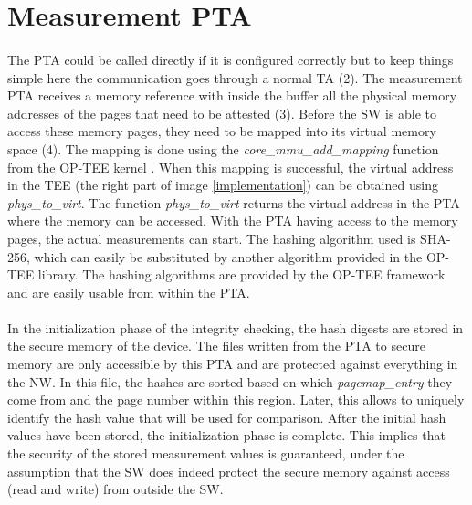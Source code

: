 \section{Measurement PTA}

\paragraph*{}
The PTA could be called directly if it is configured correctly but to keep things simple here the communication goes through a normal TA (2). The measurement PTA receives a memory reference with inside the buffer all the physical memory addresses of the pages that need to be attested (3). Before the SW is able to access these memory pages, they need to be mapped into its virtual memory space (4). The mapping is done using the \textit{core\_mmu\_add\_mapping} function from the OP-TEE kernel \cite{OPTEEgit}. When this mapping is successful, the virtual address in the TEE (the right part of image \ref{implementation}) can be obtained using \textit{phys\_to\_virt}. The function \textit{phys\_to\_virt} returns the virtual address in the PTA where the memory can be accessed. With the PTA having access to the memory pages, the actual measurements can start. The hashing algorithm used is SHA-256, which can easily be substituted by another algorithm provided in the OP-TEE library. The hashing algorithms are provided by the OP-TEE framework and are easily usable from within the PTA.

\paragraph*{}
In the initialization phase of the integrity checking, the hash digests are stored in the secure memory of the device. The files written from the PTA to secure memory are only accessible by this PTA and are protected against everything in the NW. In this file, the hashes are sorted based on which \textit{pagemap\_entry} they come from and the page number within this region. Later, this allows to uniquely identify the hash value that will be used for comparison. After the initial hash values have been stored, the initialization phase is complete. This implies that the security of the stored measurement values is guaranteed, under the assumption that the SW does indeed protect the secure memory against access (read and write) from outside the SW. 

